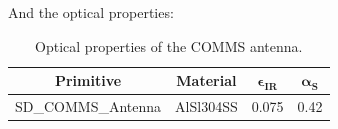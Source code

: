 And the optical properties:
\begin{table}[H]
  \centering
  \begin{tabular}{@{}cccc@{}}
  \toprule
  \textbf{Primitive} & \textbf{Material} & $\mathbf{\epsilon_{IR}}$ & $\mathbf{\alpha_{S}}$ \\ \midrule
  SD\_COMMS\_Antenna & AlSl304SS         & 0.075                    & 0.42                  \\ \bottomrule
  \end{tabular}
  \caption{Optical properties of the COMMS antenna.}
  \end{table}